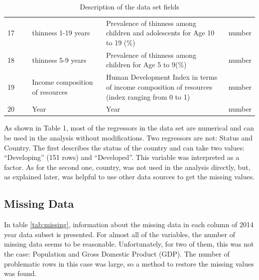 \begin{table}
\begin{tabular}{@{}p{0.1\linewidth}  p{0.3\linewidth}p{0.5\linewidth}p{0.1\linewidth}@{}}
    17 & thinness 1-19 years & Prevalence of thinness among children and adolescents for Age 10 to 19 (\%) & number \\
    18 & thinness 5-9 years & Prevalence of thinness among children for Age 5 to 9(\%) & number \\
    19 & Income composition of resources & Human Development Index in terms of income composition of resources (index ranging from 0 to 1) & number \\
    20 & Year                     & Year & number \\
    \bottomrule
  \end{tabular}
  \caption{Description of the data set fields}
  \label{tab:description}
\end{table}


As shown in Table 1, most of the regressors in the data set are numerical and can be used in the analysis without modifications. Two regressors are not: Status and Country. The first describes the status of the country and can take two values: ``Developing'' (151 rows) and ``Developed''. This variable was interpreted as a factor. As for the second one, country, was not used in the analysis directly, but, as explained later, was helpful to use other data sources to get the missing values.

\subsection{Missing Data}
\label{sec:missing-data}

In table \ref{tab:missing}, information about the missing data in each column of 2014 year data subset is presented. For almost all of the variables, the number of missing data seems to be reasonable. Unfortunately, for two of them, this was not the case: Population and Gross Domestic Product (GDP). The number of problematic rows in this case was large, so a method to restore the missing values was found.

